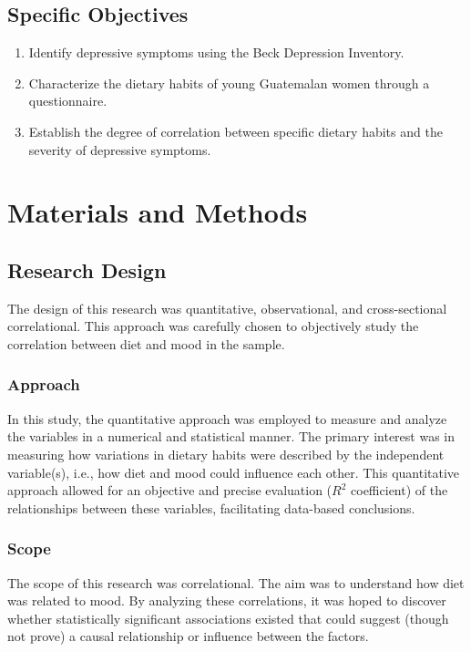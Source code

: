 \documentclass[jou]{apa7}
\begin{document}
\subsection{Specific Objectives}\label{objetivos-especuxedficos}

\begin{enumerate}
	\item Identify depressive symptoms using the Beck Depression Inventory.
	\item Characterize the dietary habits of young Guatemalan women through a questionnaire.
	\item Establish the degree of correlation between specific dietary habits and the severity of depressive symptoms.
\end{enumerate}



\section{Materials and Methods}\label{materiales-y-muxe9todos}

\subsection{Research Design}\label{diseuxf1o-investigaciuxf3n}

The design of this research was quantitative, observational, and cross-sectional correlational. This approach was carefully chosen to objectively study the correlation between diet and mood in the sample.

\subsubsection{Approach}
In this study, the quantitative approach was employed to measure and analyze the variables in a numerical and statistical manner. The primary interest was in measuring how variations in dietary habits were described by the independent variable(s), i.e., how diet and mood could influence each other. This quantitative approach allowed for an objective and precise evaluation ($R^2$ coefficient) of the relationships between these variables, facilitating data-based conclusions.

\subsubsection{Scope}
The scope of this research was correlational.
The aim was to understand how diet was related to mood. By analyzing these correlations, it was hoped to discover whether statistically significant associations existed that could suggest (though not prove) a causal relationship or influence between the factors.
\end{document}
